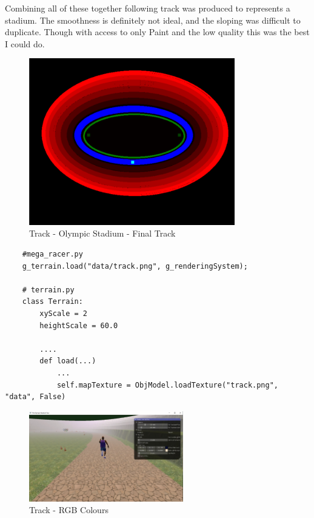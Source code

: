 \documentclass[a4 paper, 12pt]{article}
\begin{document}
Combining all of these together following track was produced to represents a stadium. The smoothness is definitely not ideal, and the sloping was difficult to duplicate. Though with access to only Paint and the low quality this was the best I could do. 
    \begin{figure} [H]
        \centering
        \includegraphics[width=0.8\textwidth, frame]
            {./images/olympics/track_final.PNG}  
        \caption{Track - Olympic Stadium - Final Track}   
    \end{figure}

    \begin{lstlisting}
    #mega_racer.py    
    g_terrain.load("data/track.png", g_renderingSystem);

    # terrain.py
    class Terrain:
        xyScale = 2
        heightScale = 60.0

        ....
        def load(...)
            ...    
            self.mapTexture = ObjModel.loadTexture("track.png", "data", False)
    \end{lstlisting}

\begin{figure} [H]
    \centering
    \includegraphics[width=0.6\textwidth, frame]
        {./images/olympics/map_world.PNG}  
    \caption{Track - RGB Colours}   
\end{figure}
\end{document}
